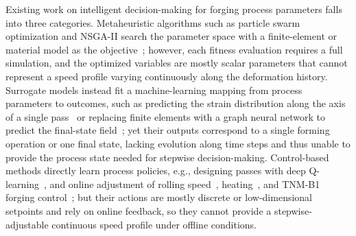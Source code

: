 Existing work on intelligent decision-making for forging process parameters falls into three categories. Metaheuristic algorithms such as particle swarm optimization and NSGA-II search the parameter space with a finite-element or material model as the objective~\cite{chen2019strategy, ding2024enhancing}; however, each fitness evaluation requires a full simulation, and the optimized variables are mostly scalar parameters that cannot represent a speed profile varying continuously along the deformation history. Surrogate models instead fit a machine-learning mapping from process parameters to outcomes, such as predicting the strain distribution along the axis of a single pass~\cite{dischino2021open} or replacing finite elements with a graph neural network to predict the final-state field~\cite{shivaditya2022graph}; yet their outputs correspond to a single forming operation or one final state, lacking evolution along time steps and thus unable to provide the process state needed for stepwise decision-making. Control-based methods directly learn process policies, e.g., designing passes with deep Q-learning~\cite{reinisch2021successful}, and online adjustment of rolling speed~\cite{zhang2020online}, heating~\cite{ma2022using}, and TNM-B1 forging control~\cite{stendal2024developing}; but their actions are mostly discrete or low-dimensional setpoints and rely on online feedback, so they cannot provide a stepwise-adjustable continuous speed profile under offline conditions.


